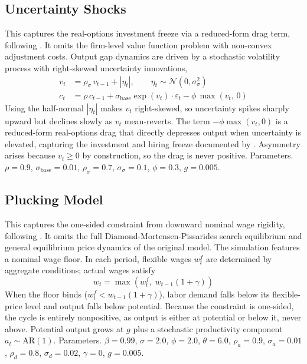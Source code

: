 \documentclass[10pt]{article}
\begin{document}
\subsection*{Uncertainty Shocks}

This captures the real-options investment freeze via a reduced-form drag term, following \citet{bloom2009}. It omits the firm-level value function problem with non-convex adjustment costs. Output gap dynamics are driven by a stochastic volatility process with right-skewed uncertainty innovations,
\begin{align}
v_t &= \rho_\sigma \, v_{t-1} + |\eta_t|, \qquad \eta_t \sim \mathcal{N}(0, \sigma_\sigma^2) \\
c_t &= \rho \, c_{t-1} + \sigma_{\text{base}} \exp(v_t) \cdot \varepsilon_t - \phi \, \max(v_t,\, 0)
\end{align}
Using the half-normal $|\eta_t|$ makes $v_t$ right-skewed, so uncertainty spikes sharply upward but declines slowly as $v_t$ mean-reverts. The term $-\phi \max(v_t, 0)$ is a reduced-form real-options drag that directly depresses output when uncertainty is elevated, capturing the investment and hiring freeze documented by \citet{bloom2009}. Asymmetry arises because $v_t \geq 0$ by construction, so the drag is never positive. Parameters. $\rho = 0.9$, $\sigma_{\text{base}} = 0.01$, $\rho_\sigma = 0.7$, $\sigma_\sigma = 0.1$, $\phi = 0.3$, $g = 0.005$.

\subsection*{Plucking Model}

This captures the one-sided constraint from downward nominal wage rigidity, following \citet{dupraz_etal2020}. It omits the full Diamond-Mortensen-Pissarides search equilibrium and general equilibrium price dynamics of the original model. The simulation features a nominal wage floor. In each period, flexible wages $w^f_t$ are determined by aggregate conditions; actual wages satisfy
\begin{equation}
w_t = \max\!\left(w^f_t,\; w_{t-1}(1 + \gamma)\right)
\end{equation}
When the floor binds ($w^f_t < w_{t-1}(1+\gamma)$), labor demand falls below its flexible-price level and output falls below potential. Because the constraint is one-sided, the cycle is entirely nonpositive, as output is either at potential or below it, never above. Potential output grows at $g$ plus a stochastic productivity component $a_t \sim \text{AR}(1)$. Parameters. $\beta = 0.99$, $\sigma = 2.0$, $\phi = 2.0$, $\theta = 6.0$, $\rho_a = 0.9$, $\sigma_a = 0.01$, $\rho_d = 0.8$, $\sigma_d = 0.02$, $\gamma = 0$, $g = 0.005$.
\end{document}
